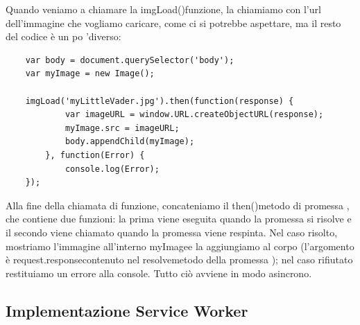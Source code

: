 \documentclass[italian]{article}
\begin{document}
Quando veniamo a chiamare la imgLoad()funzione, la chiamiamo con l'url dell'immagine che vogliamo caricare, come ci si potrebbe aspettare, ma il resto del codice è un po 'diverso:
\begin{lstlisting}
	var body = document.querySelector('body');
	var myImage = new Image();
	
	imgLoad('myLittleVader.jpg').then(function(response) {
			var imageURL = window.URL.createObjectURL(response);
			myImage.src = imageURL;
			body.appendChild(myImage);
		}, function(Error) {
			console.log(Error);
	});
\end{lstlisting}
Alla fine della chiamata di funzione, concateniamo il then()metodo di promessa , che contiene due funzioni: la prima viene eseguita quando la promessa si risolve e il secondo viene chiamato quando la promessa viene respinta. Nel caso risolto, mostriamo l'immagine all'interno myImagee la aggiungiamo al corpo (l'argomento è request.responsecontenuto nel resolvemetodo della promessa ); nel caso rifiutato restituiamo un errore alla console.
Tutto ciò avviene in modo asincrono.

\subsection{Implementazione Service Worker}
\end{document}
